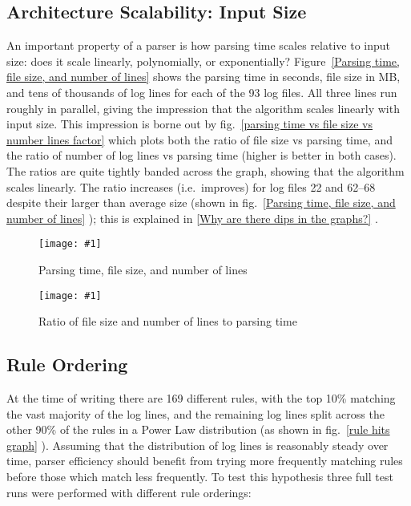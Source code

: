 \documentclass[draft]{svmult}
\newcommand{\showgraph}[3]{%
    \begin{figure}[hbt!]%
        \caption{#2}\label{#3}%
        \texttt{[image: \#1]}%
    \end{figure}%
}
\newcommand{\sectionref}[1]{%
    \textsection{}\vref*{#1}%
}
\newcommand{\refwithlabel}[2]{%
    #1~\vref{#2}%
}
\newcommand{\graphref}[1]{%
    \refwithlabel{fig.}{#1}%
}
\newcommand{\Graphref}[1]{%
    \refwithlabel{Figure}{#1}%
}
\newcommand{\numberOFlogFILES}[0]{%
    93%
}
\newcommand{\numberOFrules}[0]{%
    169%
}
\begin{document}
\subsection{Architecture Scalability: Input Size}

An important property of a parser is how parsing time scales relative to
input size: does it scale linearly, polynomially, or exponentially?
\Graphref{Parsing time, file size, and number of lines} shows the parsing
time in seconds, file size in MB, and tens of thousands of log lines for
each of the \numberOFlogFILES{} log files.  All three lines run roughly in
parallel, giving the impression that the algorithm scales linearly with
input size.  This impression is borne out by \graphref{parsing time vs file
size vs number lines factor} which plots both the ratio of file size vs
parsing time, and the ratio of number of log lines vs parsing time (higher
is better in both cases).  The ratios are quite tightly banded across the
graph, showing that the algorithm scales linearly.  The ratio increases
(i.e.\ improves) for log files 22 and 62--68 despite their larger than
average size (shown in \graphref{Parsing time, file size, and number of
lines}); this is explained in \sectionref{Why are there dips in the
graphs?}.  \showgraph{build/graph-input-size-vs-parsing-time}{Parsing time,
file size, and number of lines}{Parsing time, file size, and number of
lines} \showgraph{build/graph-input-size-vs-parsing-time-ratio}{Ratio of
file size and number of lines to parsing time}{parsing time vs file size vs
number lines factor}

\newpage
\subsection{Rule Ordering}

\label{Rule ordering}
\label{rule ordering for efficiency}
\label{rule efficiency}

At the time of writing there are \numberOFrules{} different rules, with the
top 10\% matching the vast majority of the log lines, and the remaining log
lines split across the other 90\% of the rules in a Power Law distribution
(as shown in \graphref{rule hits graph}).  Assuming that the distribution
of log lines is reasonably steady over time, parser efficiency should
benefit from trying more frequently matching rules before those which match
less frequently.  To test this hypothesis three full test runs were
performed with different rule orderings:
\end{document}
